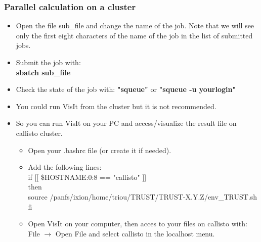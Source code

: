 \documentclass[10pt, hyperref={unicode=true,pdfusetitle, bookmarks=true,bookmarksnumbered=false,bookmarksopen=false, breaklinks=false,pdfborder={0 0 1},backref=true,colorlinks=true,linkcolor=darkblue,pageanchor}]{beamer}
\begin{document}
\begin{frame}
\frametitle{Parallel calculation on a cluster}
\begin{block}{}

\begin{itemize}
\item Open the file sub\_file and change the name of the job. Note that we will see only the first eight characters of the name of the job in the list of submitted jobs.

\item Submit the job with:\\
\textbf{sbatch sub\_file}

\item Check the state of the job with: \textbf{"squeue"} or \textbf{"squeue -u yourlogin"}

\item You could run VisIt from the cluster but it is not recommended.

\item So you can run VisIt on your PC and access/visualize the result file on callisto cluster.
        \begin{itemize}
        \item Open your .bashrc file (or create it if needed).
        \item Add the following lines:\\
        if [[ \${HOSTNAME:0:8} == "callisto" ]] \\
        then\\
           source /panfs/ixion/home/triou/TRUST/TRUST-X.Y.Z/env\_TRUST.sh \\
        fi
        \item Open VisIt on your computer, then acces to your files on callisto with:\\
        File $\rightarrow$ Open File and select callisto in the localhost menu.
        \end{itemize}

\end{itemize}

\end{block}
\end{frame}
\end{document}
